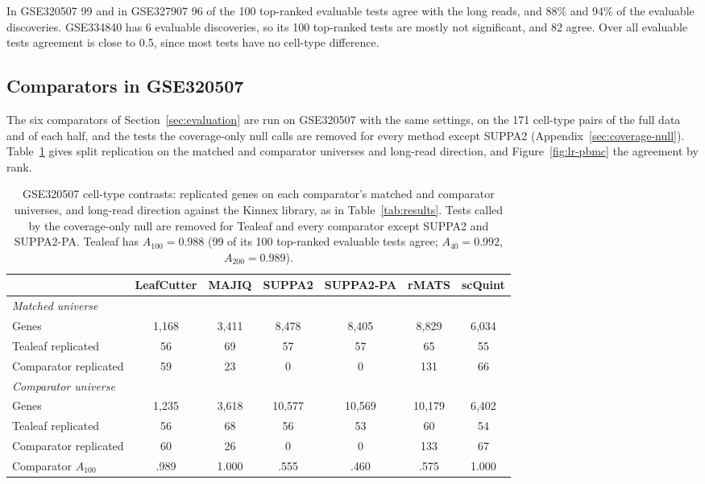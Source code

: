 \documentclass[11pt]{article}
\begin{document}
In GSE320507 99 and in GSE327907 96 of the 100 top-ranked evaluable tests agree with the long reads, and 88\% and 94\% of the evaluable discoveries. GSE334840 has 6 evaluable discoveries, so its 100 top-ranked tests are mostly not significant, and 82 agree. Over all evaluable tests agreement is close to 0.5, since most tests have no cell-type difference.

\subsection{Comparators in GSE320507}

The six comparators of Section~\ref{sec:evaluation} are run on GSE320507 with the same settings, on the 171 cell-type pairs of the full data and of each half, and the tests the coverage-only null calls are removed for every method except SUPPA2 (Appendix~\ref{sec:coverage-null}). Table~\ref{tab:pbmc-results} gives split replication on the matched and comparator universes and long-read direction, and Figure~\ref{fig:lr-pbmc} the agreement by rank.

\begin{table}[ht]
\centering
\small
\setlength{\tabcolsep}{4pt}
\begin{tabular}{lcccccc}
\toprule
 & LeafCutter & MAJIQ & SUPPA2 & SUPPA2-PA & rMATS & scQuint\\
\midrule
\multicolumn{7}{l}{\emph{Matched universe}}\\
Genes & 1{,}168 & 3{,}411 & 8{,}478 & 8{,}405 & 8{,}829 & 6{,}034\\
Tealeaf replicated & 56 & 69 & 57 & 57 & 65 & 55\\
Comparator replicated & 59 & 23 & 0 & 0 & 131 & 66\\
\midrule
\multicolumn{7}{l}{\emph{Comparator universe}}\\
Genes & 1{,}235 & 3{,}618 & 10{,}577 & 10{,}569 & 10{,}179 & 6{,}402\\
Tealeaf replicated & 56 & 68 & 56 & 53 & 60 & 54\\
Comparator replicated & 60 & 26 & 0 & 0 & 133 & 67\\
\midrule
Comparator $A_{100}$ & .989 & 1.000 & .555 & .460 & .575 & 1.000\\
\bottomrule
\end{tabular}
\caption{GSE320507 cell-type contrasts: replicated genes on each comparator's matched and comparator universes, and long-read direction against the Kinnex library, as in Table~\ref{tab:results}. Tests called by the coverage-only null are removed for Tealeaf and every comparator except SUPPA2 and SUPPA2-PA. Tealeaf has $A_{100}=0.988$ (99 of its 100 top-ranked evaluable tests agree; $A_{40}=0.992$, $A_{200}=0.989$).}
\label{tab:pbmc-results}
\end{table}
\end{document}
